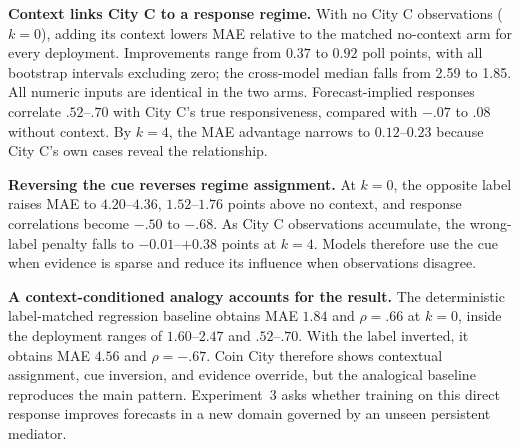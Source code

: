 \textbf{Context links City C to a response regime.}
With no City C observations ($k=0$), adding its context lowers MAE relative to the
matched no-context arm for every deployment. Improvements range from $0.37$ to
$0.92$ poll points, with all bootstrap intervals excluding zero; the cross-model
median falls from 2.59 to 1.85. All numeric inputs are identical in the two arms.
Forecast-implied responses correlate $.52$--$.70$ with City C's true responsiveness,
compared with $-.07$ to $.08$ without context. By $k=4$, the MAE advantage narrows
to $0.12$--$0.23$ because City C's own cases reveal the relationship.

\textbf{Reversing the cue reverses regime assignment.}
At $k=0$, the opposite label raises MAE to $4.20$--$4.36$, $1.52$--$1.76$ points
above no context, and response correlations become $-.50$ to $-.68$. As City C
observations accumulate, the wrong-label penalty falls to $-0.01$--$+0.38$ points
at $k=4$. Models therefore use the cue when evidence is sparse and reduce its
influence when observations disagree.

\textbf{A context-conditioned analogy accounts for the result.}
The deterministic label-matched regression baseline obtains MAE $1.84$ and
$\rho=.66$ at $k=0$, inside the deployment ranges of $1.60$--$2.47$ and
$.52$--$.70$. With the label inverted, it obtains MAE $4.56$ and $\rho=-.67$.
Coin City therefore shows contextual assignment, cue inversion, and evidence
override, but the analogical baseline reproduces the main pattern. Experiment~3
asks whether training on this direct response improves forecasts in a new domain
governed by an unseen persistent mediator.
